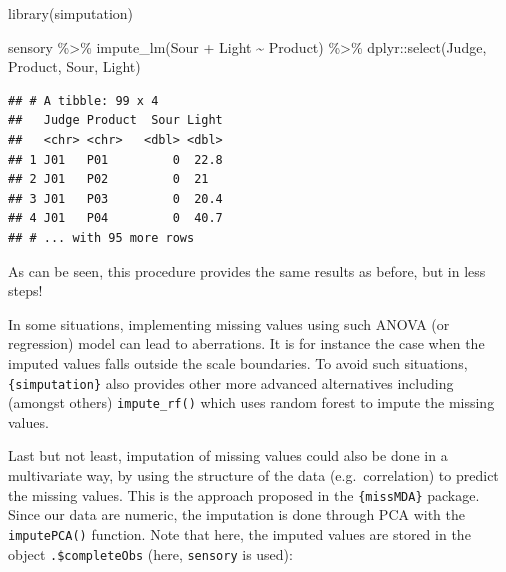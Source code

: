 \documentclass[
]{krantz}
\makeatletter
\newenvironment{Shaded}{\begin{snugshade}}{\end{snugshade}}
\newcommand{\AttributeTok}[1]{\textcolor[rgb]{0.61,0.61,0.61}{#1}}
\newcommand{\DecValTok}[1]{\textcolor[rgb]{0.06,0.06,0.06}{#1}}
\newcommand{\FunctionTok}[1]{\textcolor[rgb]{0,0,0}{#1}}
\newcommand{\NormalTok}[1]{#1}
\newcommand{\SpecialCharTok}[1]{\textcolor[rgb]{0,0,0}{#1}}
\newcommand{\StringTok}[1]{\textcolor[rgb]{0.5,0.5,0.5}{#1}}
\newenvironment{kframe}{%
\medskip{}
\setlength{\fboxsep}{.8em}
 \def\at@end@of@kframe{}%
 \ifinner\ifhmode%
  \def\at@end@of@kframe{\end{minipage}}%
  \begin{minipage}{\columnwidth}%
 \fi\fi%
 \def\FrameCommand##1{\hskip\@totalleftmargin \hskip-\fboxsep
 \colorbox{shadecolor}{##1}\hskip-\fboxsep
     \hskip-\linewidth \hskip-\@totalleftmargin \hskip\columnwidth}%
 \MakeFramed {\advance\hsize-\width
   \@totalleftmargin\z@ \linewidth\hsize
   \@setminipage}}%
 {\par\unskip\endMakeFramed%
 \at@end@of@kframe}
\renewenvironment{Shaded}{\begin{kframe}}{\end{kframe}}
\makeatother
\begin{document}
\begin{Shaded}
\begin{Highlighting}[]
\FunctionTok{library}\NormalTok{(simputation)}

\NormalTok{sensory }\SpecialCharTok{\%\textgreater{}\%} 
  \FunctionTok{impute\_lm}\NormalTok{(Sour }\SpecialCharTok{+}\NormalTok{ Light }\SpecialCharTok{\textasciitilde{}}\NormalTok{ Product) }\SpecialCharTok{\%\textgreater{}\%} 
\NormalTok{  dplyr}\SpecialCharTok{::}\FunctionTok{select}\NormalTok{(Judge, Product, Sour, Light)}
\end{Highlighting}
\end{Shaded}

\begin{verbatim}
## # A tibble: 99 x 4
##   Judge Product  Sour Light
##   <chr> <chr>   <dbl> <dbl>
## 1 J01   P01         0  22.8
## 2 J01   P02         0  21  
## 3 J01   P03         0  20.4
## 4 J01   P04         0  40.7
## # ... with 95 more rows
\end{verbatim}

As can be seen, this procedure provides the same results as before, but in less steps!

In some situations, implementing missing values using such ANOVA (or regression) model can lead to aberrations. It is for instance the case when the imputed values falls outside the scale boundaries. To avoid such situations, \texttt{\{simputation\}} also provides other more advanced alternatives including (amongst others) \texttt{impute\_rf()} which uses random forest to impute the missing values.

Last but not least, imputation of missing values could also be done in a multivariate way, by using the structure of the data (e.g.~correlation) to predict the missing values. This is the approach proposed in the \texttt{\{missMDA\}} package. Since our data are numeric, the imputation is done through PCA with the \texttt{imputePCA()} function. Note that here, the imputed values are stored in the object \texttt{.\$completeObs} (here, \texttt{sensory} is used):

\begin{Shaded}
\end{Shaded}
\end{document}
